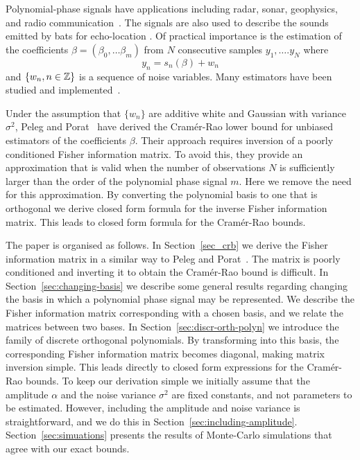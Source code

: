 \documentclass[journal,10pt]{IEEEtran}
\begin{document}
Polynomial-phase signals have applications including radar, sonar, geophysics, and radio communication~\cite{Angeby_estimating_2000}.  The signals are also used to describe the sounds emitted by bats for echo-location \cite{Peleg_DPT_1995}.  Of practical importance is the estimation of the coefficients $\beta = (\beta_0, \dots \beta_m)$ from $N$ consecutive samples $y_1, \dots. y_N$ where 
\[
y_n = s_n(\beta) + w_n
\]
and $\{w_n, n \in {\mathbb Z}\}$ is a sequence of noise variables.  Many estimators have been studied and implemented~\cite{Peleg_DPT_1995, Angeby_estimating_2000, Djuric_phase_unwrap_chirp_1990, Oshea_iterative_1996, Barbarossa_analysis_of_PPS_1997, Slocumb_polynomial_1994, Morelande_bayes_unwrapping_2008, Kitchen_polyphase_unwrapping_1994}.

Under the assumption that $\{w_n\}$ are additive white and Gaussian with variance $\sigma^2$, Peleg and Porat~\cite{Peleg1991_CRB_PPS_1991} have derived the Cram\'{e}r-Rao lower bound for unbiased estimators of the coefficients $\beta$.  Their approach requires inversion of a poorly conditioned Fisher information matrix.  To avoid this, they provide an approximation that is valid when the number of observations $N$ is sufficiently larger than the order of the polynomial phase signal $m$.  Here we remove the need for this approximation.  By converting the polynomial basis to one that is orthogonal we derive closed form formula for the inverse Fisher information matrix.  This leads to closed form formula for the Cram\'{e}r-Rao bounds.  %

The paper is organised as follows.  In Section~\ref{sec_crb} we derive the Fisher information matrix in a similar way to Peleg and Porat~\cite{Peleg1991_CRB_PPS_1991}.  The matrix is poorly conditioned and inverting it to obtain the Cram\'{e}r-Rao bound is difficult.  In Section~\ref{sec:changing-basis} we describe some general results regarding changing the basis in which a polynomial phase signal may be represented.  We describe the Fisher information matrix corresponding with a chosen basis, and we relate the matrices between two bases.  In Section~\ref{sec:discr-orth-polyn} we introduce the family of discrete orthogonal polynomials.  By transforming into this basis, the corresponding Fisher information matrix becomes diagonal, making matrix inversion simple.  This leads directly to closed form expressions for the Cram\'{e}r-Rao bounds.  To keep our derivation simple we initially assume that the amplitude $\alpha$ and the noise variance $\sigma^2$ are fixed constants, and not parameters to be estimated.  However, including the amplitude and noise variance is straightforward, and we do this in Section~\ref{sec:including-amplitude}.  Section~\ref{sec:simuations} presents the results of Monte-Carlo simulations that agree with our exact bounds.
\end{document}
